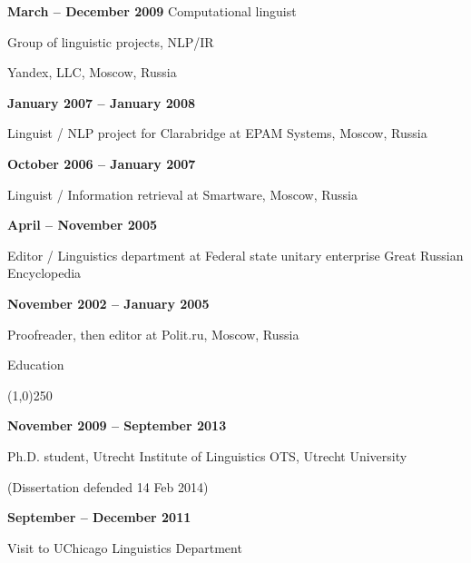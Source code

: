 \documentclass[12pt,letterpaper]{article}
\begin{document}
\small{
\noindent\textbf{March -- December 2009} Computational linguist 

Group of linguistic projects, NLP/IR 

Yandex, LLC, Moscow, Russia
}

\vspace{2mm}
%
%
%
%
\small{
\noindent\textbf{January 2007 -- January 2008}

Linguist / NLP project for Clarabridge at EPAM Systems, Moscow, Russia 
}

\vspace{2mm}

\small{
\noindent\textbf{October 2006 -- January 2007}

Linguist / Information retrieval at Smartware, Moscow, Russia
}
%
%
%
%
\vspace{2mm}

\small{
\noindent\textbf{April -- November 2005}

Editor / Linguistics department at Federal state unitary enterprise Great Russian Encyclopedia
}
%
\vspace{2mm}

\small{
\noindent\textbf{November 2002 -- January 2005}

Proofreader, then editor at Polit.ru, Moscow, Russia 
}

\vspace{5mm}




\noindent \Large{Education}

\vspace{-4mm}
\noindent\line(1,0){250}

\vspace{2mm}

\small{
\noindent\textbf{November 2009 -- September 2013}

Ph.D. student, Utrecht Institute of Linguistics OTS, Utrecht University

(Dissertation defended 14 Feb 2014)
}

\vspace{2mm}

\small{
\noindent\textbf{September --  December 2011}

Visit to UChicago Linguistics Department
}
\end{document}
